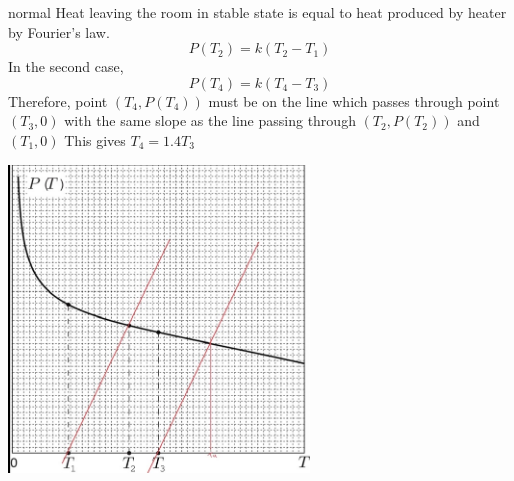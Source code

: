 \begin{solution}{normal}
Heat leaving the room in stable state is equal to heat produced by heater by Fourier's law.
$$P(T_2) = k(T_2-T_1)$$
In the second case,
$$ P(T_4) = k(T_4-T_3)$$
Therefore, point $(T_4,P(T_4))$ must be on the line which passes through point $(T_3,0)$ with the same slope as the line passing through $(T_2,P(T_2))$ and $(T_1,0)$
This gives $\boxed {T_4=1.4T_3}$
\begin{center}
    \includegraphics[width=8cm]{t38.jpeg}
\end{center}
\end{solution}
